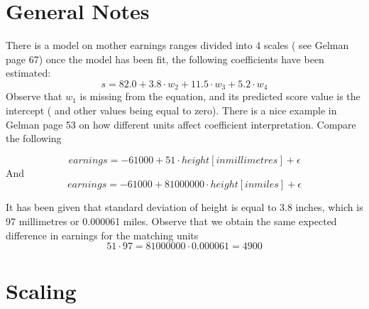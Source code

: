 \documentclass{article}
\begin{document}
\section{General Notes}
There is a model on mother earnings ranges divided into 4 scales ( see Gelman page 67)
once the model has been fit, the following coefficients have been estimated:
\begin{equation}
s = 82.0 + 3.8 \cdot w_2 + 11.5 \cdot w_3 + 5.2 \cdot w_4
\end{equation}
Observe that $w_1$ is missing from the equation, and its predicted score value is the intercept ( and other values being equal to zero).
There is a nice example in Gelman page 53 on how different units affect coefficient interpretation. Compare the following

\begin{equation}
earnings = -61000 + 51 \cdot height[in millimetres] + \epsilon
\end{equation}
And
\begin{equation}
 earnings = -61000 + 81000000 \cdot height[in miles] + \epsilon
\end{equation}

It has been given that standard deviation of height is equal to 3.8 inches, which is 97 millimetres or 0.000061 miles. Observe that we obtain the same expected difference in earnings for the matching units
\begin{equation}
51 \cdot 97 = 81000000 \cdot 0.000061 = 4900
\end{equation}

\section{Scaling}
\end{document}
